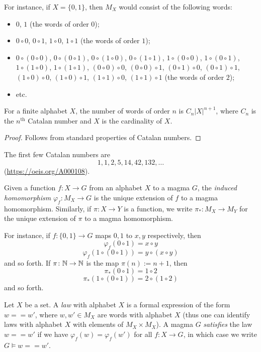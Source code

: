 For instance, if $X = \{0,1\}$, then $M_X$ would consist of the following words:
\begin{itemize}
  \item $0$, $1$ (the words of order $0$);
  \item $0 \circ 0$, $0 \circ 1$, $1 \circ 0$, $1 \circ 1$ (the words of order $1$);
  \item $0 \circ (0 \circ 0)$, $0 \circ (0 \circ 1)$, $0 \circ (1 \circ 0)$, $0 \circ (1 \circ 1)$, $1 \circ (0 \circ 0)$, $1 \circ (0 \circ 1)$, $1 \circ (1 \circ 0)$, $1 \circ (1 \circ 1)$, $(0 \circ 0) \circ 0$, $(0 \circ 0) \circ 1$, $(0 \circ 1) \circ 0$, $(0 \circ 1) \circ 1$, $(1 \circ 0) \circ 0$, $(1 \circ 0) \circ 1$, $(1 \circ 1) \circ 0$, $(1 \circ 1) \circ 1$ (the words of order $2$);
  \item etc.
\end{itemize}

\begin{lemma}  For a finite alphabet $X$, the number of words of order $n$ is $C_n |X|^{n+1}$, where $C_n$ is the $n^{\mathrm{th}}$ Catalan number and $X$ is the cardinality of $X$.
\end{lemma}

\begin{proof} Follows from standard properties of Catalan numbers.
\end{proof}

The first few Catalan numbers are
$$ 1, 1, 2, 5, 14, 42, 132, \dots$$
(\href{OEIS A000108}{https://oeis.org/A000108}).


\begin{definition}\label{induced-def}  Given a function $f: X \to G$ from an alphabet $X$ to a magma $G$, the \emph{induced homomorphism} $\varphi_f: M_X \to G$ is the unique extension of $f$ to a magma homomorphism.  Similarly, if $\pi \colon X \to Y$ is a function, we write $\pi_* \colon M_X \to M_Y$ for the unique extension of $\pi$ to a magma homomorphism.
\end{definition}

For instance, if $f : \{0,1\} \to G$ maps $0,1$ to $x,y$ respectively, then
$$ \varphi_f(0 \circ 1) = x \circ y$$
$$ \varphi_f(1 \circ (0 \circ 1)) = y \circ (x \circ y)$$
and so forth.  If $\pi \colon \mathbb{N} \to \mathbb{N}$ is the map $\pi(n) := n+1$, then
$$ \pi_*(0 \circ 1) = 1 \circ 2$$
$$ \pi_*(1 \circ (0 \circ 1)) = 2 \circ (1 \circ 2)$$
and so forth.

\begin{definition}[Law]\label{law-def}  Let $X$ be a set. A \emph{law} with alphabet $X$ is a formal expression of the form $w == w'$, where $w, w' \in M_X$ are words with alphabet $X$ (thus one can identify laws with alphabet $X$ with elements of $M_X \times M_X$).  A magma $G$ \emph{satisfies} the law $w == w'$ if we have $\varphi_f( w ) = \varphi_f ( w' )$ for all $f: X \to G$, in which case we write $G \models w == w'$.
\end{definition}

